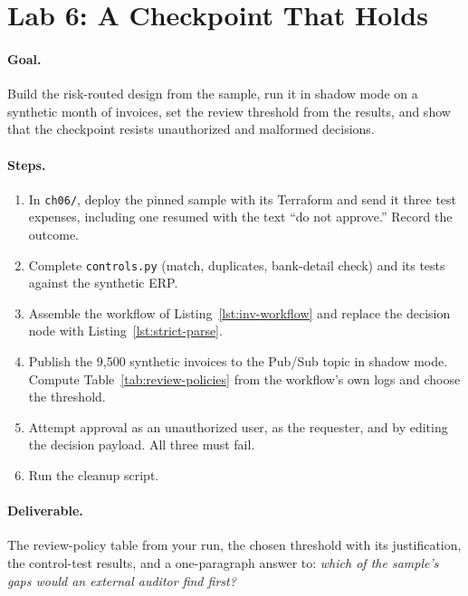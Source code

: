 \section*{Lab 6: A Checkpoint That Holds}

\paragraph{Goal.} Build the risk-routed design from the sample, run it in shadow mode on a synthetic month of invoices, set the review threshold from the results, and show that the checkpoint resists unauthorized and malformed decisions.

\paragraph{Steps.}
\begin{enumerate}[itemsep=2pt]
  \item In \texttt{ch06/}, deploy the pinned sample with its Terraform and send it three test expenses, including one resumed with the text ``do not approve.'' Record the outcome.
  \item Complete \texttt{controls.py} (match, duplicates, bank-detail check) and its tests against the synthetic ERP.
  \item Assemble the workflow of Listing~\ref{lst:inv-workflow} and replace the decision node with Listing~\ref{lst:strict-parse}.
  \item Publish the 9{,}500 synthetic invoices to the Pub/Sub topic in shadow mode. Compute Table~\ref{tab:review-policies} from the workflow's own logs and choose the threshold.
  \item Attempt approval as an unauthorized user, as the requester, and by editing the decision payload. All three must fail.
  \item Run the cleanup script.
\end{enumerate}

\paragraph{Deliverable.} The review-policy table from your run, the chosen threshold with its justification, the control-test results, and a one-paragraph answer to: \emph{which of the sample's gaps would an external auditor find first?}
